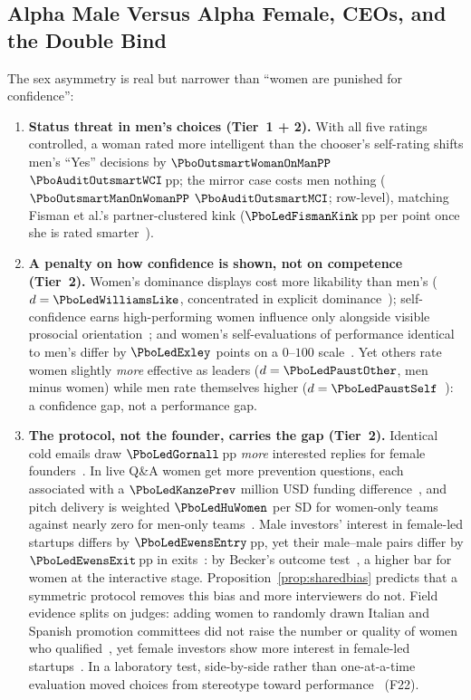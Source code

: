 \subsection{Alpha Male Versus Alpha Female, CEOs, and the Double Bind}
The sex asymmetry is real but narrower than ``women are punished for confidence'':
\begin{enumerate}[leftmargin=1.4em,itemsep=1.5pt,topsep=2pt]
\item \textbf{Status threat in men's choices (Tier~1 + 2).} With all five ratings controlled, a woman rated more intelligent than the chooser's self-rating shifts men's ``Yes'' decisions by $\PboOutsmartWomanOnManPP$ $\PboAuditOutsmartWCI$\,pp; the mirror case costs men nothing ($\PboOutsmartManOnWomanPP$ $\PboAuditOutsmartMCI$; row-level), matching Fisman et al.'s partner-clustered kink ($\PboLedFismanKink$\,pp per point once she is rated smarter~\cite{fisman2006}).
\item \textbf{A penalty on how confidence is shown, not on competence (Tier~2).} Women's dominance displays cost more likability than men's ($d=\PboLedWilliamsLike$, concentrated in explicit dominance~\cite{williams2016}); self-confidence earns high-performing women influence only alongside visible prosocial orientation~\cite{guillen2018}; and women's self-evaluations of performance identical to men's differ by $\PboLedExley$ points on a $0$--$100$ scale~\cite{exley2022}. Yet others rate women slightly \emph{more} effective as leaders ($d=\PboLedPaustOther$, men minus women) while men rate themselves higher ($d=\PboLedPaustSelf$~\cite{paustian2014}): a confidence gap, not a performance gap.
\item \textbf{The protocol, not the founder, carries the gap (Tier~2).} Identical cold emails draw $\PboLedGornall$\,pp \emph{more} interested replies for female founders~\cite{gornall2025}. In live Q\&A women get more prevention questions, each associated with a $\PboLedKanzePrev$ million USD funding difference~\cite{kanze2018}, and pitch delivery is weighted $\PboLedHuWomen$ per SD for women-only teams against nearly zero for men-only teams~\cite{hu2025}. Male investors' interest in female-led startups differs by $\PboLedEwensEntry$\,pp, yet their male--male pairs differ by $\PboLedEwensExit$\,pp in exits~\cite{ewens2020}: by Becker's outcome test~\cite{becker1957}, a higher bar for women at the interactive stage. Proposition~\ref{prop:sharedbias} predicts that a symmetric protocol removes this bias and more interviewers do not. Field evidence splits on judges: adding women to randomly drawn Italian and Spanish promotion committees did not raise the number or quality of women who qualified~\cite{bagues2017}, yet female investors show more interest in female-led startups~\cite{ewens2020}. In a laboratory test, side-by-side rather than one-at-a-time evaluation moved choices from stereotype toward performance~\cite{bohnet2016} (F22).

\end{enumerate}
